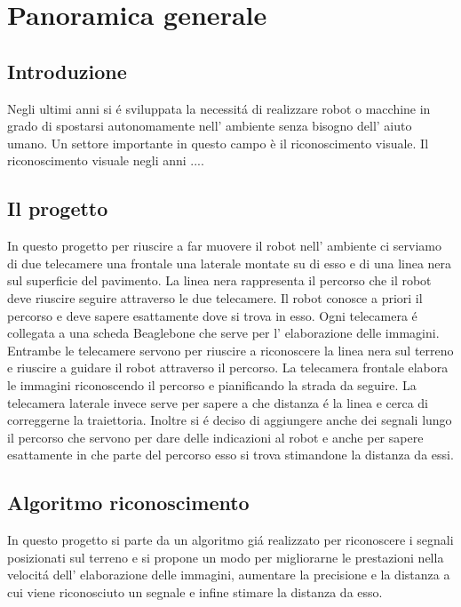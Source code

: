 \chapter{Panoramica generale}

\section{Introduzione}

	Negli ultimi anni si \'e sviluppata la necessit\'a di realizzare robot o macchine in grado di spostarsi autonomamente nell' ambiente senza bisogno dell' aiuto umano. Un settore importante in questo campo è il riconoscimento visuale. Il riconoscimento visuale negli anni ....

\section{Il progetto}
	In questo progetto per riuscire a far muovere il robot nell' ambiente ci serviamo di due telecamere una frontale una laterale montate su di esso e di una linea nera sul superficie del pavimento.
	La linea nera rappresenta il percorso che il robot deve riuscire seguire attraverso le due telecamere. Il robot conosce a priori il percorso e deve sapere esattamente dove si trova in esso. Ogni telecamera \'e collegata a una scheda Beaglebone che serve per l' elaborazione delle immagini. Entrambe le telecamere servono per riuscire a riconoscere la linea nera sul terreno e riuscire a guidare il robot attraverso il percorso. La telecamera frontale elabora le immagini riconoscendo il percorso e pianificando la strada da seguire. La telecamera laterale invece serve per sapere a che distanza \'e la linea e cerca di correggerne la traiettoria.
	Inoltre si \'e deciso di aggiungere anche dei segnali lungo il percorso che servono per dare delle indicazioni al robot e anche per sapere esattamente in che parte del percorso esso si trova stimandone la distanza da essi.

\section{Algoritmo riconoscimento}

	In questo progetto si parte da un algoritmo gi\'a realizzato per riconoscere i segnali posizionati sul terreno e si propone un modo per migliorarne le prestazioni nella velocit\'a dell' elaborazione delle immagini, aumentare la precisione e la distanza a cui viene riconosciuto un segnale e infine stimare la distanza da esso.
	
